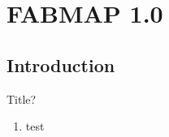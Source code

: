 \section{FABMAP 1.0}

\subsection{Introduction}
\begin{frame}{Title?}
   \begin{enumerate}
       \item test
   \end{enumerate} 
\end{frame}
